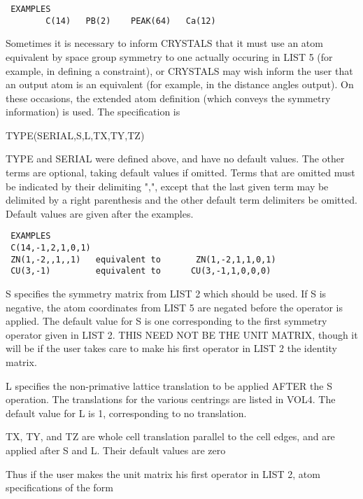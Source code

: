\documentclass[10pt,a4paper]{report}
\begin{document}
\small\begin{verbatim}
 EXAMPLES
        C(14)   PB(2)    PEAK(64)   Ca(12)
\end{verbatim}\normalsize




Sometimes it is necessary to inform CRYSTALS that it must use an atom
 equivalent by space group symmetry to one actually occuring in LIST 5
 (for example, in defining a constraint), or CRYSTALS may wish inform the 
 user that an output atom is an equivalent (for example, in the distance
 angles output). On these occasions, the extended atom definition 
 (which conveys the symmetry information) is used. The specification is


TYPE(SERIAL,S,L,TX,TY,TZ)


TYPE and SERIAL were defined above, and have no default values. The other
 terms are optional, taking default values if omitted. Terms that are omitted
 must be indicated by their delimiting ",", except that the last given term may
 be delimited by a right parenthesis and the other default term delimiters be
 omitted.  Default values are given after the examples.




\small\begin{verbatim}
 EXAMPLES
 C(14,-1,2,1,0,1)
 ZN(1,-2,,1,,1)   equivalent to       ZN(1,-2,1,1,0,1)
 CU(3,-1)         equivalent to	     CU(3,-1,1,0,0,0)
\end{verbatim}\normalsize




S specifies the symmetry matrix from
 LIST 2 which should be used. If S is negative, the atom coordinates from LIST
 5 are negated before the operator is applied. The default value for S is one
 corresponding to the first symmetry operator given in LIST 2. THIS NEED NOT
 BE THE UNIT MATRIX, though it will be if the user takes care to make his
 first  operator in LIST 2 the identity matrix.


L specifies the non-primative lattice translation to be applied AFTER the S
 operation. The translations for the various centrings are listed in  
 VOL4. The default value for L is 1, corresponding to no translation.


TX, TY, and TZ are whole cell translation parallel to the cell edges, and 
 are applied after S and L. Their default values are zero


Thus if the user makes the unit matrix his first operator in LIST 2,
 atom specifications of the form
\end{document}
